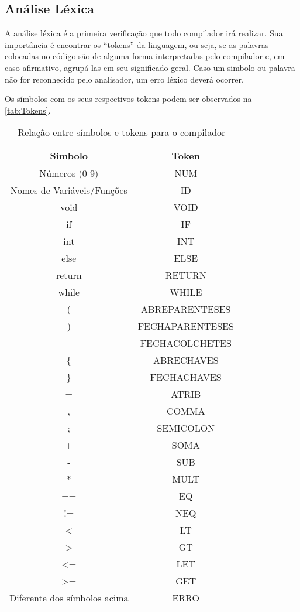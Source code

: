 \documentclass[
	12pt,				%
	oneside,
	a4paper,			%
	english,			%
	french,				%
	spanish,			%
	brazil,				%
	]{abntex2}
\begin{document}
\subsection{Análise Léxica}

A análise léxica é a primeira verificação que todo compilador irá realizar. Sua importância é encontrar os ``tokens'' da linguagem, ou seja, se as palavras colocadas no código são de alguma forma interpretadas pelo compilador e, em caso afirmativo, agrupá-las em seu significado geral. Caso um simbolo ou palavra não for reconhecido pelo analisador, um erro léxico deverá ocorrer.

Os símbolos com os seus respectivos tokens podem ser observados na \autoref{tab:Tokens}.

\begin{table}[H]
\centering
\ABNTEXfontereduzida
\caption{Relação entre símbolos e tokens para o compilador} \label{tab:Tokens}
\begin{tabular}{||c c||} 
 \hline
 Simbolo & Token\\ [0.5ex] 
 \hline\hline
 Números (0-9) & NUM \\ 
 \hline
 Nomes de Variáveis/Funções & ID \\
 \hline
 void  &  VOID\\
 \hline
 if  &  IF\\
 \hline
 int  &  INT\\
 \hline
 else  &  ELSE\\
 \hline
 return  &  RETURN\\
 \hline
 while  &  WHILE\\
 \hline
 (  &  ABREPARENTESES\\
 \hline
 )  &  FECHAPARENTESES\\
 \hline
 [  &  ABRECOLCHETES\\
 \hline
 ]  &  FECHACOLCHETES\\
 \hline
 \{  &  ABRECHAVES\\
 \hline
 \}  &  FECHACHAVES\\
 \hline
 =  &  ATRIB\\
 \hline
 ,  &  COMMA\\
 \hline
 ;  &  SEMICOLON\\
 \hline
 +  &  SOMA\\
 \hline
 -  &  SUB\\
 \hline
 *  &  MULT\\
 \hline
 ==  &  EQ\\
 \hline
 !=  &  NEQ\\
 \hline
 <  &  LT\\
 \hline
 >  &  GT\\
 \hline
 <=  &  LET\\
 \hline
 >=  &  GET\\
 \hline
 Diferente dos símbolos acima  &  ERRO\\
 \hline
\end{tabular}
\end{table}
\end{document}
